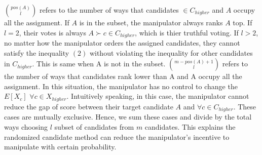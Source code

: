 \documentclass[letterpaper]{article} %
\begin{document}
$\binom{pos(A)}{l}$ refers to the number of ways that candidates $\in C_{higher}$ and $A$ occupy all the assignment. If $A$ is in the subset, the manipulator always ranks $A$ top. If $l = 2$, their votes is always $A\succ c \in C_{higher}$, which is thier truthful voting. If $l>2$, no matter how the manipulator orders the assigned candidates, they cannot satisfy the inequality $(2)$ without violating the inequality for other candidates in $C_{higher}$. This is same when A is not in the subset.
$\binom{m-pos(A)+1}{l}$ refers to the number of ways that candidates rank lower than A and A occupy all the assignment. In this situation, the manipulator has no control to change the $E[X_c]$ $\forall c \in X_{higher}$. Intuitively speaking, in this case, the manipulator cannot reduce the gap of score between their target candidate $A$ and $\forall c \in C_{higher}$. These cases are mutually exclusive. Hence, we sum these cases and divide by the total ways choosing $l$ subset of candidates from $m$ candidates. This explains the randomized candidate method can reduce the manipulator’s incentive to manipulate with certain probability. 
\end{document}

